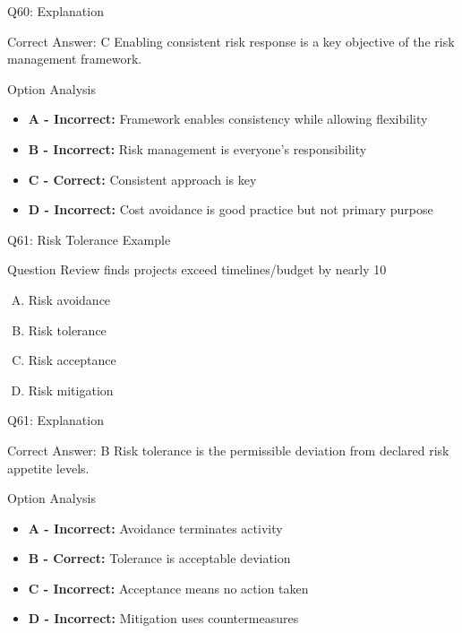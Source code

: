 \documentclass{beamer}
\begin{document}
	\begin{frame}{Q60: Explanation}
		\begin{block}{Correct Answer: C}
			Enabling consistent risk response is a key objective of the risk management framework.
		\end{block}
		\begin{block}{Option Analysis}
			\begin{itemize}
				\item \textbf{A - Incorrect:} Framework enables consistency while allowing flexibility
				\item \textbf{B - Incorrect:} Risk management is everyone's responsibility
				\item \textbf{C - Correct:} Consistent approach is key
				\item \textbf{D - Incorrect:} Cost avoidance is good practice but not primary purpose
			\end{itemize}
		\end{block}
	\end{frame}
	
	\begin{frame}{Q61: Risk Tolerance Example}
		\begin{block}{Question}
			Review finds projects exceed timelines/budget by nearly 10%
		\end{block}
		\begin{enumerate}[(A)]
			\item Risk avoidance
			\item Risk tolerance
			\item Risk acceptance
			\item Risk mitigation
		\end{enumerate}
	\end{frame}
	
	\begin{frame}{Q61: Explanation}
		\begin{block}{Correct Answer: B}
			Risk tolerance is the permissible deviation from declared risk appetite levels.
		\end{block}
		\begin{block}{Option Analysis}
			\begin{itemize}
				\item \textbf{A - Incorrect:} Avoidance terminates activity
				\item \textbf{B - Correct:} Tolerance is acceptable deviation
				\item \textbf{C - Incorrect:} Acceptance means no action taken
				\item \textbf{D - Incorrect:} Mitigation uses countermeasures
			\end{itemize}
		\end{block}
	\end{frame}
	
\end{document}
